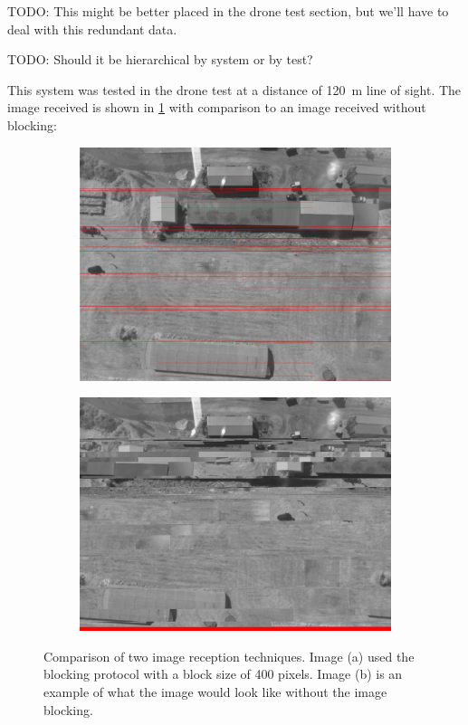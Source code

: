 \documentclass[a4paper,11pt]{article}
\begin{document}
TODO: This might be better placed in the drone test section, but we'll have to deal with this redundant data.

TODO: Should it be hierarchical by system or by test?

This system was tested in the drone test at a distance of \SI{120}{\meter} line of sight. The image received is shown in \ref{fig:image-blocking-example} with comparison to an image received without blocking:

\begin{figure}[H]
  \begin{subfigure}{.5\textwidth}
    \centering
    \includegraphics[width=\linewidth]{images/results/sheds.png}
    \caption{}
  \end{subfigure}
  \begin{subfigure}{.5\textwidth}
    \centering
    \includegraphics[width=\linewidth]{images/results/sheds_naive.png}
    \caption{}
  \end{subfigure}
  \caption{Comparison of two image reception techniques. Image (a) used the blocking protocol with a block size of 400 pixels. Image (b) is an example of what the image would look like without the image blocking.}
  \label{fig:image-blocking-example}
\end{figure}
\end{document}
